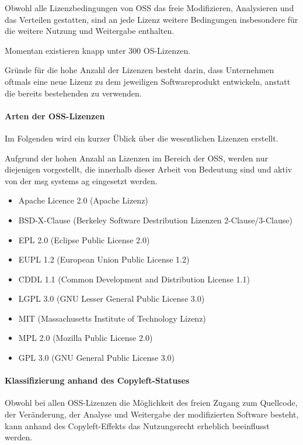 Obwohl alle Lizenzbedingungen von OSS das freie Modifizieren, Analysieren und das Verteilen gestatten, sind an jede Lizenz weitere Bedingungen insbesondere für die weitere Nutzung und Weitergabe enthalten. 

Momentan existieren knapp unter 300 OS-Lizenzen. 

Gründe für die hohe Anzahl der Lizenzen besteht darin, dass Unternehmen oftmals eine neue Lizenz zu dem jeweiligen Softwareprodukt entwickeln, anstatt die bereits bestehenden zu verwenden. 

\paragraph{Arten der OSS-Lizenzen}
Im Folgenden wird ein kurzer Üblick über die wesentlichen Lizenzen erstellt. 

Aufgrund der hohen Anzahl an Lizenzen im Bereich der OSS, werden nur diejenigen vorgestellt, die innerhalb dieser Arbeit von Bedeutung sind und aktiv von der msg systems ag eingesetzt werden. 

\begin{itemize}
    \item Apache Licence 2.0 (Apache Lizenz)
    \item BSD-X-Clause (Berkeley Software Destribution Lizenzen 2-Clause/3-Clause)
    \item EPL 2.0 (Eclipse Public License 2.0)
    \item EUPL 1.2 (European Union Public License 1.2)
    \item CDDL 1.1 (Common Development and Distribution License 1.1)
    \item LGPL 3.0 (GNU Lesser General Public License 3.0)
    \item MIT (Massachusetts Institute of Technology Lizenz)
    \item MPL 2.0 (Mozilla Public License 2.0)
    \item GPL 3.0 (GNU General Public License 3.0)
\end{itemize}

\paragraph{Klassifizierung anhand des Copyleft-Statuses}
Obwohl bei allen OSS-Lizenzen die Möglichkeit des freien Zugang zum Quellcode, der Veränderung, der Analyse und Weitergabe der modifizierten Software besteht, kann anhand des Copyleft-Effekts das Nutzungsrecht erheblich beeinflusst werden.

